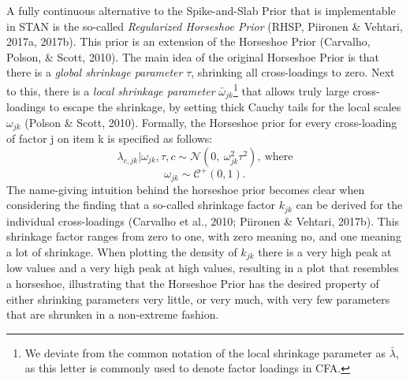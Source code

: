 \documentclass[
  man, donotrepeattitle,floatsintext]{apa6}
\begin{document}
A fully continuous alternative to the Spike-and-Slab Prior that is implementable in STAN is the so-called \emph{Regularized Horseshoe Prior} (RHSP, Piironen \& Vehtari, 2017a, 2017b). This prior is an extension of the Horseshoe Prior (Carvalho, Polson, \& Scott, 2010). The main idea of the original Horseshoe Prior is that there is a \emph{global shrinkage parameter} \(\tau\), shrinking all cross-loadings to zero. Next to this, there is a \emph{local shrinkage parameter} \(\bar{\omega}_{jk}\)\footnote{We deviate from the common notation of the local shrinkage parameter as \(\bar{\lambda}\), as this letter is commonly used to denote factor loadings in CFA.} that allows truly large cross-loadings to escape the shrinkage, by setting thick Cauchy tails for the local scales \(\omega_{jk}\) (Polson \& Scott, 2010). Formally, the Horseshoe prior for every cross-loading of factor j on item k is specified as follows:
\[\lambda_{c,jk} | \omega_{jk}, \tau, c\sim \mathcal{N}(0, \ \omega^2_{jk} \tau^2), \ \text{where}\]
\[\omega_{jk} \sim \mathcal{C^+}(0, 1).\]
The name-giving intuition behind the horseshoe prior becomes clear when considering the finding that a so-called shrinkage factor \(k_{jk}\) can be derived for the individual cross-loadings (Carvalho et al., 2010; Piironen \& Vehtari, 2017b). This shrinkage factor ranges from zero to one, with zero meaning no, and one meaning a lot of shrinkage. When plotting the density of \(k_{jk}\) there is a very high peak at low values and a very high peak at high values, resulting in a plot that resembles a horseshoe, illustrating that the Horseshoe Prior has the desired property of either shrinking parameters very little, or very much, with very few parameters that are shrunken in a non-extreme fashion.
\end{document}
